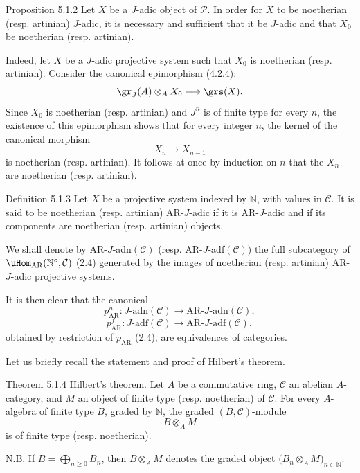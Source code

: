 \begin{statement}{Proposition 5.1.2}
Let \(X\) be a \(J\)-adic object of \(\mathcal P\). In order for \(X\) to be noetherian (resp. artinian) \(J\)-adic, it is necessary and sufficient that it be \(J\)-adic and that \(X_0\) be noetherian (resp. artinian).
\end{statement}

\begin{prooftext}
Indeed, let \(X\) be a \(J\)-adic projective system such that \(X_0\) is noetherian (resp. artinian). Consider the canonical epimorphism (4.2.4):
\[
\gr_J(A)\otimes_A X_0\longrightarrow \grs(X).
\]
Since \(X_0\) is noetherian (resp. artinian) and \(J^n\) is of finite type for every \(n\), the existence of this epimorphism shows that for every integer \(n\), the kernel of the canonical morphism
\[
X_n\longrightarrow X_{n-1}
\]
is noetherian (resp. artinian). It follows at once by induction on \(n\) that the \(X_n\) are noetherian (resp. artinian).
\end{prooftext}

\begin{statement}{Definition 5.1.3}
Let \(X\) be a projective system indexed by \(\mathbb N\), with values in \(\mathcal C\). It is said to be noetherian (resp. artinian) AR-\(J\)-adic if it is AR-\(J\)-adic and if its components are noetherian (resp. artinian) objects.
\end{statement}

We shall denote by AR-\(J\)-adn\((\mathcal C)\) (resp. AR-\(J\)-adf\((\mathcal C)\)) the full subcategory of \(\uHom_{\mathrm{AR}}(\mathbb N^\circ,\mathcal C)\) (2.4) generated by the images of noetherian (resp. artinian) AR-\(J\)-adic projective systems.

It is then clear that the canonical 
\[
p^n_{\mathrm{AR}}:J\text{-adn}(\mathcal C)\longrightarrow \mathrm{AR}\text{-}J\text{-adn}(\mathcal C),
\]
\[
p^f_{\mathrm{AR}}:J\text{-adf}(\mathcal C)\longrightarrow \mathrm{AR}\text{-}J\text{-adf}(\mathcal C),
\]
obtained by restriction of \(p_{\mathrm{AR}}\) (2.4), are equivalences of categories.

Let us briefly recall the statement and proof of Hilbert's theorem.

\begin{statement}{Theorem 5.1.4}
Hilbert's theorem. Let \(A\) be a commutative ring, \(\mathcal C\) an abelian \(A\)-category, and \(M\) an object of finite type (resp. noetherian) of \(\mathcal C\). For every \(A\)-algebra of finite type \(B\), graded by \(\mathbb N\), the graded \((B,\mathcal C)\)-module
\[
B\otimes_A M
\]
is of finite type (resp. noetherian).

N.B. If \(B=\bigoplus_{n\ge0}B_n\), then \(B\otimes_A M\) denotes the graded object \(\bigl(B_n\otimes_A M\bigr)_{n\in\mathbb N}\).
\end{statement}

